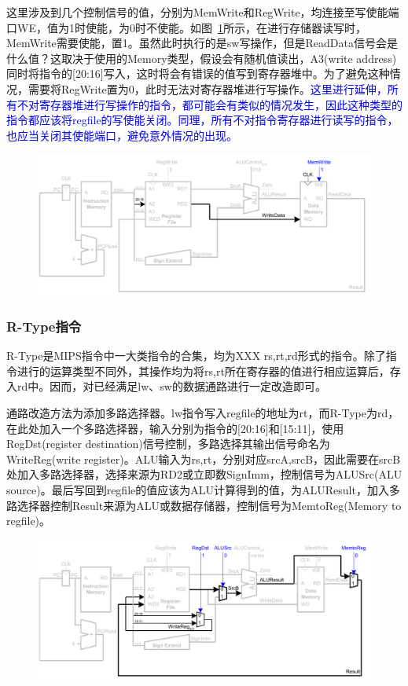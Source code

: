 这里涉及到几个控制信号的值，分别为MemWrite和RegWrite，均连接至写使能端口WE，值为1时使能，为0时不使能。如图~\ref{fig:sw}所示，在进行存储器读写时，MemWrite需要使能，置1。虽然此时执行的是sw写操作，但是ReadData信号会是什么值？这取决于使用的Memory类型，假设会有随机值读出，A3(write address)同时将指令的[20:16]写入，这时将会有错误的值写到寄存器堆中。为了避免这种情况，需要将RegWrite置为0，此时无法对寄存器堆进行写操作。\textcolor{blue}{这里进行延伸，所有不对寄存器堆进行写操作的指令，都可能会有类似的情况发生，因此这种类型的指令都应该将regfile的写使能关闭。同理，所有不对指令寄存器进行读写的指令，也应当关闭其使能端口，避免意外情况的出现。}

\begin{figure}[htbp]
	\centering
	\includegraphics[width=1.0\textwidth]{image/sw.pdf}
	\caption{\label{fig:sw}}
\end{figure}
\subsubsection{R-Type指令}
R-Type是MIPS指令中一大类指令的合集，均为XXX rs,rt,rd形式的指令。除了指令进行的运算类型不同外，其操作均为将rs,rt所在寄存器的值进行相应运算后，存入rd中。因而，对已经满足lw、sw的数据通路进行一定改造即可。

通路改造方法为添加多路选择器。lw指令写入regfile的地址为rt，而R-Type为rd，在此处加入一个多路选择器，输入分别为指令的[20:16]和[15:11]，使用RegDst(register destination)信号控制，多路选择其输出信号命名为WriteReg(write register)。ALU输入为rs,rt，分别对应srcA,srcB，因此需要在srcB处加入多路选择器，选择来源为RD2或立即数SignImm，控制信号为ALUSrc(ALU source)。最后写回到regfile的值应该为ALU计算得到的值，为ALUResult，加入多路选择器控制Result来源为ALU或数据存储器，控制信号为MemtoReg(Memory to regfile)。

\begin{figure}[htbp]
	\centering
	\includegraphics[width=1.0\textwidth]{image/R-type.pdf}
	\caption{\label{fig:R-type}}
\end{figure}
